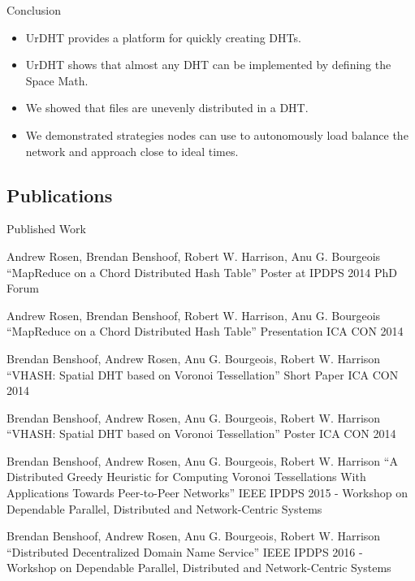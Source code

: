 \documentclass[11pt]{beamer}
\begin{document}
\begin{frame}{Conclusion}
	\begin{itemize}
		\item UrDHT provides a platform for quickly creating DHTs.
		\item UrDHT shows that almost any DHT can be implemented by defining the Space Math.
		\item We showed that files are  unevenly distributed in a DHT.
		\item We demonstrated strategies nodes can use to autonomously load balance the network and approach close to ideal times.
	\end{itemize}
\end{frame}



\subsection{Publications}
\begin{frame}{Published Work}
 	\begin{itemize}\tiny{
		\item Andrew Rosen, Brendan Benshoof, Robert W. Harrison, Anu G. Bourgeois ``MapReduce on a Chord Distributed Hash Table'' Poster at IPDPS 2014 PhD Forum
		\item Andrew Rosen, Brendan Benshoof, Robert W. Harrison, Anu G. Bourgeois ``MapReduce on a Chord Distributed Hash Table'' Presentation ICA CON 2014
		\item Brendan Benshoof, Andrew Rosen, Anu G. Bourgeois, Robert W. Harrison ``VHASH: Spatial DHT based on Voronoi Tessellation'' Short Paper ICA CON 2014 
		\item Brendan Benshoof, Andrew Rosen, Anu G. Bourgeois, Robert W. Harrison ``VHASH: Spatial DHT based on Voronoi Tessellation'' Poster ICA CON 2014 
		\item Brendan Benshoof, Andrew Rosen, Anu G. Bourgeois, Robert W. Harrison ``A Distributed Greedy Heuristic for Computing Voronoi Tessellations With Applications Towards Peer-to-Peer Networks'' IEEE IPDPS 2015 - Workshop on Dependable Parallel, Distributed and Network-Centric Systems}
		\item Brendan Benshoof, Andrew Rosen, Anu G. Bourgeois, Robert W. Harrison
	``Distributed Decentralized Domain Name Service''
	IEEE IPDPS 2016 - Workshop on Dependable Parallel, Distributed and Network-Centric Systems
	
	\end{itemize}
	
\end{frame}
\end{document}
